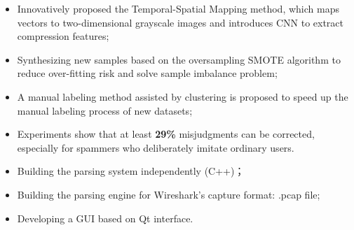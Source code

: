 \documentclass{resume}
\begin{document}
\begin{itemize}
  \item Innovatively proposed the Temporal-Spatial Mapping method, which maps vectors to two-dimensional grayscale images and introduces CNN to extract compression features;
  \item Synthesizing new samples based on the oversampling SMOTE algorithm to reduce over-fitting risk and solve sample imbalance problem;
  \item A manual labeling method assisted by clustering is proposed to speed up the manual labeling process of new datasets;
  \item Experiments show that at least \textbf{29\%} misjudgments can be corrected, especially for spammers who deliberately imitate ordinary users.
\end{itemize}


\begin{itemize}
  \item Building the parsing system independently (C++)；
  \item Building the parsing engine for Wireshark's capture format: .pcap file;
  \item Developing a GUI based on Qt interface.
\end{itemize}

\end{document}
